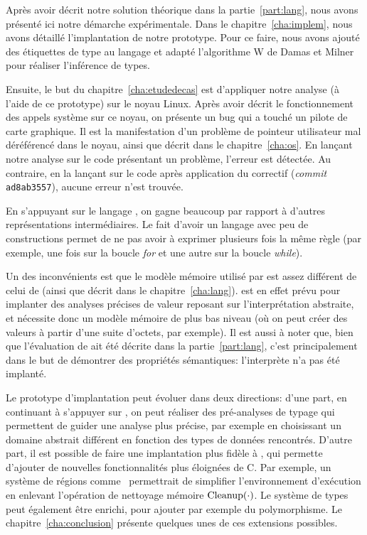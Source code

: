 Après avoir décrit notre solution théorique dans la partie~\ref{part:lang}, nous
avons présenté ici notre démarche expérimentale. Dans le
chapitre~\ref{cha:implem}, nous avons détaillé l'implantation de notre
prototype. Pour ce faire, nous avons ajouté des étiquettes de type au langage
\newspeak et adapté l'algorithme W de Damas et Milner pour réaliser l'inférence
de types.

Ensuite, le but du chapitre~\ref{cha:etudedecas} est d'appliquer notre analyse
(à l'aide de ce prototype) sur le noyau Linux. Après avoir décrit le
fonctionnement des appels système sur ce noyau, on présente un bug qui a touché
un pilote de carte graphique. Il est la manifestation d'un problème de pointeur
utilisateur mal déréférencé dans le noyau, ainsi que décrit dans le
chapitre~\ref{cha:os}. En lançant notre analyse sur le code présentant un
problème, l'erreur est détectée. Au contraire, en la lançant sur le code après
application du correctif (\emph{commit} \texttt{ad8ab3557}), aucune erreur n'est
trouvée.

En s'appuyant sur le langage \newspeak, on gagne beaucoup par rapport à d'autres
représentations intermédiaires. Le fait d'avoir un langage avec peu de
constructions permet de ne pas avoir à exprimer plusieurs fois la même règle
(par exemple, une fois sur la boucle \emph{for} et une autre sur la boucle
\emph{while}).


Un des inconvénients est que le modèle mémoire utilisé par \newspeak est assez
différent de celui de \langname (ainsi que décrit dans le
chapitre~\ref{cha:lang}). \newspeak est en effet prévu pour implanter des
analyses précises de valeur reposant sur l'interprétation abstraite, et
nécessite donc un modèle mémoire de plus bas niveau (où on peut créer des
valeurs à partir d'une suite d'octets, par exemple). Il est aussi à noter que,
bien que l'évaluation de \langname ait été décrite dans la
partie~\ref{part:lang}, c'est principalement dans le but de démontrer des
propriétés sémantiques: l'interprète n'a pas été implanté.

Le prototype d'implantation peut évoluer dans deux directions: d'une part, en
continuant à s'appuyer sur \newspeak, on peut réaliser des pré-analyses de
typage qui permettent de guider une analyse plus précise, par exemple en
choisissant un domaine abstrait différent en fonction des types de données
rencontrés. D'autre part, il est possible de faire une implantation plus fidèle
à \langname, qui permette d'ajouter de nouvelles fonctionnalités plus éloignées
de C. Par exemple, un système de régions comme~\cite{jfp92} permettrait de
simplifier l'environnement d'exécution en enlevant l'opération de nettoyage
mémoire $\mathrm{Cleanup}(\cdot)$. Le système de types peut également être enrichi, pour
ajouter par exemple du polymorphisme. Le chapitre~\ref{cha:conclusion} présente
quelques unes de ces extensions possibles.

